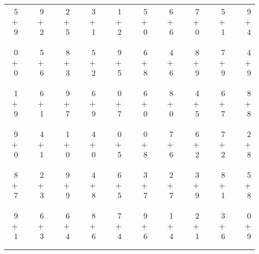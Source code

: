 \documentclass[12pt, letterpaper]{article}
\begin{document}
\begin{tabular}{rrrrrrrrrrrrrrrrrrr}
5 & & 9 & & 2 & & 3 & & 1 & & 5 & & 6 & & 7 & & 5 & & 9\\
$+$ 9 & & $+$ 2 & & $+$ 5 & & $+$ 1 & & $+$ 2 & & $+$ 0 & & $+$ 6 & & $+$ 0 & & $+$ 1 & & $+$ 4\\
\cline{1-1} \cline{3-3} \cline{5-5} \cline{7-7} \cline{9-9} \cline{11-11} \cline{13-13} \cline{15-15} \cline{17-17} \cline{19-19} \\ \\
0 & & 5 & & 8 & & 5 & & 9 & & 6 & & 4 & & 8 & & 7 & & 4\\
$+$ 0 & & $+$ 6 & & $+$ 3 & & $+$ 2 & & $+$ 5 & & $+$ 8 & & $+$ 6 & & $+$ 9 & & $+$ 9 & & $+$ 9\\
\cline{1-1} \cline{3-3} \cline{5-5} \cline{7-7} \cline{9-9} \cline{11-11} \cline{13-13} \cline{15-15} \cline{17-17} \cline{19-19} \\ \\
1 & & 6 & & 9 & & 6 & & 0 & & 6 & & 8 & & 4 & & 6 & & 8\\
$+$ 9 & & $+$ 1 & & $+$ 7 & & $+$ 9 & & $+$ 7 & & $+$ 0 & & $+$ 0 & & $+$ 5 & & $+$ 7 & & $+$ 8\\
\cline{1-1} \cline{3-3} \cline{5-5} \cline{7-7} \cline{9-9} \cline{11-11} \cline{13-13} \cline{15-15} \cline{17-17} \cline{19-19} \\ \\
9 & & 4 & & 1 & & 4 & & 0 & & 0 & & 7 & & 6 & & 7 & & 2\\
$+$ 0 & & $+$ 1 & & $+$ 0 & & $+$ 0 & & $+$ 5 & & $+$ 8 & & $+$ 6 & & $+$ 2 & & $+$ 2 & & $+$ 8\\
\cline{1-1} \cline{3-3} \cline{5-5} \cline{7-7} \cline{9-9} \cline{11-11} \cline{13-13} \cline{15-15} \cline{17-17} \cline{19-19} \\ \\
8 & & 2 & & 9 & & 4 & & 6 & & 3 & & 2 & & 3 & & 8 & & 5\\
$+$ 7 & & $+$ 3 & & $+$ 9 & & $+$ 8 & & $+$ 5 & & $+$ 7 & & $+$ 7 & & $+$ 9 & & $+$ 1 & & $+$ 8\\
\cline{1-1} \cline{3-3} \cline{5-5} \cline{7-7} \cline{9-9} \cline{11-11} \cline{13-13} \cline{15-15} \cline{17-17} \cline{19-19} \\ \\
9 & & 6 & & 6 & & 8 & & 7 & & 9 & & 1 & & 2 & & 3 & & 0\\
$+$ 1 & & $+$ 3 & & $+$ 4 & & $+$ 6 & & $+$ 4 & & $+$ 6 & & $+$ 4 & & $+$ 1 & & $+$ 6 & & $+$ 9\\
\cline{1-1} \cline{3-3} \cline{5-5} \cline{7-7} \cline{9-9} \cline{11-11} \cline{13-13} \cline{15-15} \cline{17-17} \cline{19-19} \\ \\

\end{tabular}
\end{document}
